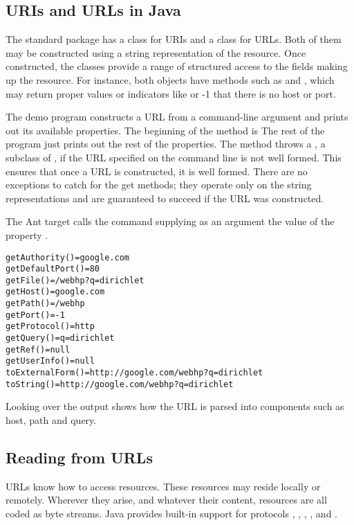 \subsection{URIs and URLs in Java}

The standard  package has a class  for URIs
and a class  for URLs.  Both of them may be constructed
using a string representation of the resource.  Once constructed, the
classes provide a range of structured access to the fields making up
the resource.  For instance, both objects have methods such as
 and , which may return proper values
or indicators like  or -1 that there is no host or port.

The demo program  constructs a URL from a
command-line argument and prints out its available properties.  The
beginning of the  method is
%
%
The rest of the program just prints out the rest of the properties.
The  method throws a , a
subclass of , if the URL specified on the command
line is not well formed.  This ensures that once a URL is constructed,
it is well formed.  There are no exceptions to catch for the get
methods; they operate only on the string representations and are
guaranteed to succeed if the URL was constructed.

The Ant target  calls the command supplying as
an argument the value of the property .
%
\begin{verbatim}
getAuthority()=google.com
getDefaultPort()=80
getFile()=/webhp?q=dirichlet
getHost()=google.com
getPath()=/webhp
getPort()=-1
getProtocol()=http
getQuery()=q=dirichlet
getRef()=null
getUserInfo()=null
toExternalForm()=http://google.com/webhp?q=dirichlet
toString()=http://google.com/webhp?q=dirichlet
\end{verbatim}
%
Looking over the output shows how the URL is parsed into components
such as host, path and query.

\subsection{Reading from URLs}

URLs know how to access resources.  These resources may reside locally
or remotely.  Wherever they arise, and whatever their content, 
resources are all coded as byte streams.  Java provides built-in support
for protocols , , , , and 
.  

